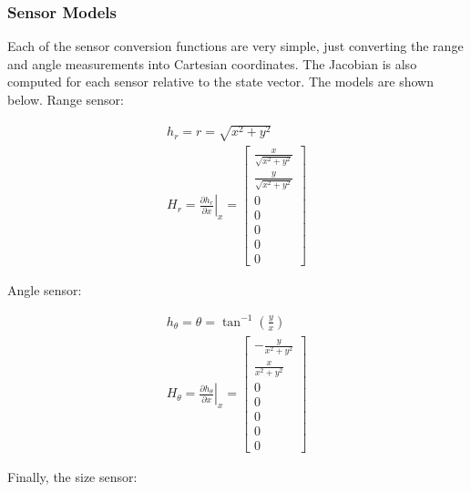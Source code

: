 \documentclass[12pt]{article}
\begin{document}
\subsubsection{Sensor Models}

Each of the sensor conversion functions are very simple, just converting the range and angle measurements into Cartesian coordinates. The Jacobian is also computed for each sensor relative to the state vector. The models are shown below. Range sensor:

\begin{equation}
    \label{eqn:p1-range-model}
    \begin{gathered}
        h_{r} = r = \sqrt{x^2 + y^2} \\
        H_{r} = \left. \frac{\partial h_{r}}{\partial x} \right|_x =
        \begin{bmatrix}
            \frac{x}{\sqrt{x^2 + y^2}} \\ \frac{y}{\sqrt{x^2 + y^2}} \\ 0 \\ 0 \\ 0 \\ 0 \\ 0
        \end{bmatrix}
    \end{gathered}
\end{equation}

Angle sensor:

\begin{equation}
    \label{eqn:p1-angle-model}
    \begin{gathered}
        h_{\theta} = \theta = \tan^{-1} \left( \frac{y}{x} \right) \\
        H_{\theta} = \left. \frac{\partial h_{\theta}}{\partial x} \right|_x =
        \begin{bmatrix}
            -\frac{y}{x^2 + y^2} \\ \frac{x}{x^2 + y^2} \\ 0 \\ 0 \\ 0 \\ 0 \\ 0
        \end{bmatrix}
    \end{gathered}
\end{equation}

Finally, the size sensor:
\end{document}
